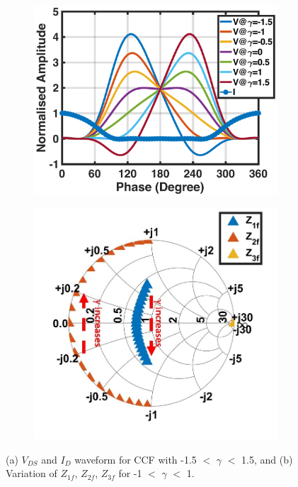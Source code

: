 \documentclass[conference]{IEEEtran}
\begin{document}
\begin{figure}[!t]
\captionsetup{font=footnotesize}
\centering
\begin{subfigure}{0.24\textwidth}
\centering
\includegraphics[width=1\textwidth]{Images/CCF/CCF_wave_VI.pdf}
\caption{}
\label{fig:CCF_wave_VI}
\end{subfigure}
\begin{subfigure}{0.24\textwidth}
\includegraphics[width=1\textwidth]{Images/CCF/CCF_SC.jpg}
\caption{}
\label{fig:CCF_SC}
\end{subfigure}
\caption{(a) $V_{DS}$ and $I_D$ waveform for CCF with -1.5 $<$ $\gamma$ $<$ 1.5, and (b) Variation of $Z_{1f}$, $Z_{2f}$, $Z_{3f}$ for -1 $<$ $\gamma$ $<$ 1.}
\label{fig:CCF_VI_SC}
\vspace{-0.2in}
\end{figure}
\end{document}
